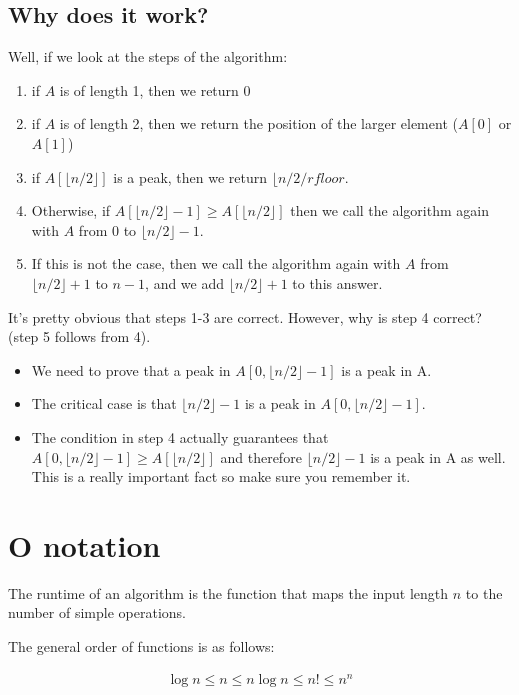 \documentclass[11pt,a4paper,titlepage,dvipsnames,cmyk]{scrartcl}
\begin{document}
\subsection{Why does it work?}%
\label{sub:explanation}
Well, if we look at the steps of the algorithm:
\begin{enumerate}
    \item if $A$ is of length 1, then we return 0
    \item if $A$ is of length 2, then we return the position of the larger
        element ($A[0]$ or $A[1]$)
    \item if $A[\lfloor n/2 \rfloor]$ is a peak, then we return $\lfloor
        n/2 /rfloor$.
    \item Otherwise, if $A[\lfloor n/2 \rfloor - 1] \ge A[\lfloor n/2
        \rfloor]$ then we call the algorithm again with $A$ from $0$ to
        $\lfloor n/2 \rfloor - 1$.
    \item If this is not the case, then we call the algorithm again with
        $A$ from $\lfloor n/2 \rfloor + 1$ to $n-1$, and we add $\lfloor
        n/2 \rfloor + 1$ to this answer.
\end{enumerate}

It's pretty obvious that steps 1-3 are correct. However, why is step 4
correct? (step 5 follows from 4).
\begin{itemize}
    \item We need to prove that a peak in $A[0, \lfloor n/2 \rfloor - 1]$
        is a peak in A.
    \item The critical case is that $\lfloor n/2 \rfloor - 1$ is a peak in
        $A[0, \lfloor n/2 \rfloor - 1]$.
    \item The condition in step 4 actually guarantees that $A[0, \lfloor
        n/2 \rfloor - 1] \ge A[\lfloor n/2 \rfloor]$ and therefore
        $\lfloor n/2 \rfloor - 1$ is a peak in A as well. This is a really
        important fact so make sure you remember it.
\end{itemize}

\section{O notation}%
\label{sec:o-notation}

The runtime of an algorithm is the function that maps the input length $n$
to the number of simple operations.

The general order of functions is as follows:

\begin{align*}
    \log n \le n \le n \log n \le n! \le n^n
\end{align*}
\end{document}

